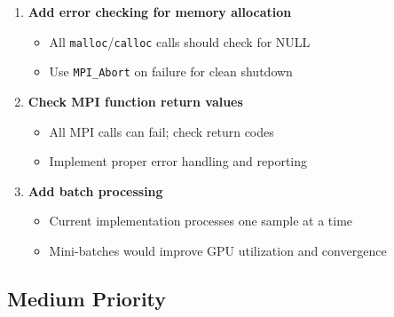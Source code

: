 \documentclass[11pt,a4paper]{article}
\begin{document}
\begin{enumerate}
    \item \textbf{Add error checking for memory allocation}
    \begin{itemize}
        \item All \texttt{malloc}/\texttt{calloc} calls should check for NULL
        \item Use \texttt{MPI\_Abort} on failure for clean shutdown
    \end{itemize}
    
    \item \textbf{Check MPI function return values}
    \begin{itemize}
        \item All MPI calls can fail; check return codes
        \item Implement proper error handling and reporting
    \end{itemize}
    
    \item \textbf{Add batch processing}
    \begin{itemize}
        \item Current implementation processes one sample at a time
        \item Mini-batches would improve GPU utilization and convergence
    \end{itemize}
\end{enumerate}

\subsection{Medium Priority}
\end{document}
